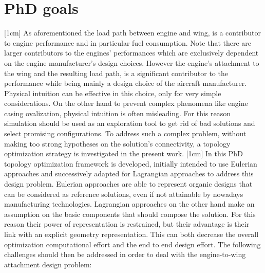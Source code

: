 \section*{PhD goals}
[1cm]
As aforementioned the load path between engine and wing, is a contributor to engine performance and in particular fuel consumption. Note that there are larger contributors to the engines’ performances which are exclusively dependent on the engine manufacturer's design choices. However the engine's attachment to the wing and the resulting load path, is a significant contributor to the performance while being mainly a design choice of the aircraft manufacturer.
Physical intuition can be effective in this choice, only for very simple considerations. On the other hand to prevent complex phenomena like engine casing ovalization, physical intuition is often misleading. For this reason simulation should be used as an exploration tool to get rid of bad solutions and select promising configurations. To address such a complex problem, without making too strong hypotheses on the solution's connectivity, a topology optimization strategy is investigated in the present work. 
[1cm]
In this PhD topology optimization framework is developed, initially intended to use Eulerian approaches and successively adapted for Lagrangian approaches to address this design problem. Eulerian approaches are able to represent organic designs that can be considered as reference solutions, even if not attainable by nowadays manufacturing technologies. Lagrangian approaches on the other hand make an assumption on the basic components that should compose the solution. For this reason their power of representation is restrained, but their advantage is their link with an explicit geometry representation. This can both decrease the overall optimization computational effort and the end to end design effort.
The following challenges should then be addressed in order to deal with the engine-to-wing attachment design problem:
